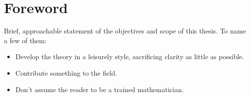 \begingroup
\let\clearpage\relax
\let\cleardoublepage\relax
\let\cleardoublepage\relax

\chapter*{Foreword}
Brief, approachable statement of the objectives and scope of this thesis. To name a few of 
them:

\begin{itemize}
	\item Develop the theory in a leisurely style, sacrificing clarity as little as 
		possible.
	\item Contribute something to the field.
	\item Don't assume the reader to be a trained mathematician.
\end{itemize}

\endgroup

\vfill
